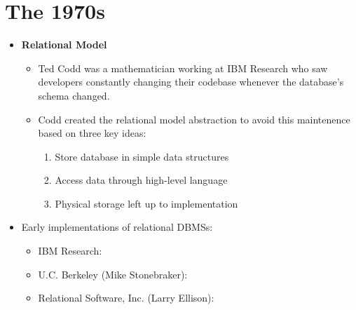 \documentclass[11pt]{article}
\begin{document}
\section{The 1970s}
\begin{itemize}
    \item \textbf{Relational Model}~\cite{codd70}
    \begin{itemize}
        \item
        Ted Codd was a mathematician working at IBM Research who saw developers constantly 
        changing their codebase whenever the database's schema changed.
        
        \item
        Codd created the relational model abstraction to avoid this maintenence based on three key 
        ideas:
        \begin{enumerate}
            \item Store database in simple data structures
            \item Access data through high-level language
            \item Physical storage left up to implementation
        \end{enumerate}
    \end{itemize}
    \item Early implementations of relational DBMSs:
    \begin{itemize}
        \item IBM Research: 
        \item U.C. Berkeley (Mike Stonebraker): 
        \item Relational Software, Inc. (Larry Ellison): 
    \end{itemize}
\end{itemize}
\end{document}
